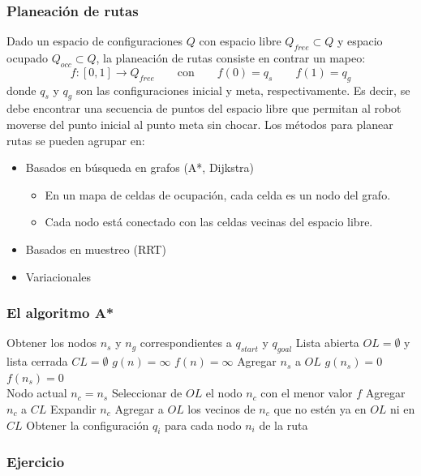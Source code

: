 \begin{frame}\frametitle{Planeación de rutas}
  Dado un espacio de configuraciones $Q$ con espacio libre $Q_{free}\subset Q$ y espacio ocupado $Q_{occ}\subset Q$, la planeación de rutas consiste en contrar un mapeo:
  \[f: [0,1] \rightarrow Q_{free} \qquad \textrm{con}\qquad f(0) = q_s\qquad f(1)=q_g\]
  donde $q_s$ y $q_g$ son las configuraciones inicial y meta, respectivamente. Es decir, se debe encontrar una secuencia de puntos del espacio libre que permitan al robot moverse del punto inicial al punto meta sin chocar. Los métodos para planear rutas se pueden agrupar en:
  \begin{itemize}
  \item Basados en búsqueda en grafos (A*, Dijkstra)
    \begin{itemize}
    \item En un mapa de celdas de ocupación, cada celda es un nodo del grafo.
    \item Cada nodo está conectado con las celdas vecinas del espacio libre. 
    \end{itemize}
  \item Basados en muestreo (RRT)
  \item Variacionales
  \end{itemize}
\end{frame}

\begin{frame}\frametitle{El algoritmo A*}
    \begin{algorithm}[H]
    \footnotesize
    \DontPrintSemicolon
    Obtener los nodos $n_s$ y $n_g$ correspondientes a $q_{start}$ y $q_{goal}$\;
    Lista abierta $OL = \emptyset$ y lista cerrada $CL = \emptyset$\;
    {
      $g(n) = \infty$\;
      $f(n) = \infty$\;
    }
    Agregar $n_s$ a $OL$\;
    $g(n_s) = 0$\\
    $f(n_s) = 0$\\
    Nodo actual $n_c = n_s$\;
    {
      Seleccionar de $OL$ el nodo $n_c$ con el menor valor $f$\;
      Agregar $n_c$ a $CL$\;
      Expandir $n_c$\;
      Agregar a $OL$ los vecinos de $n_c$ que no estén ya en $OL$ ni en $CL$\;
    }
    Obtener la configuración $q_i$ para cada nodo $n_i$ de la ruta\;
  \end{algorithm}
\end{frame}

\begin{frame}[containsverbatim]\frametitle{Ejercicio}
    
\end{frame}

